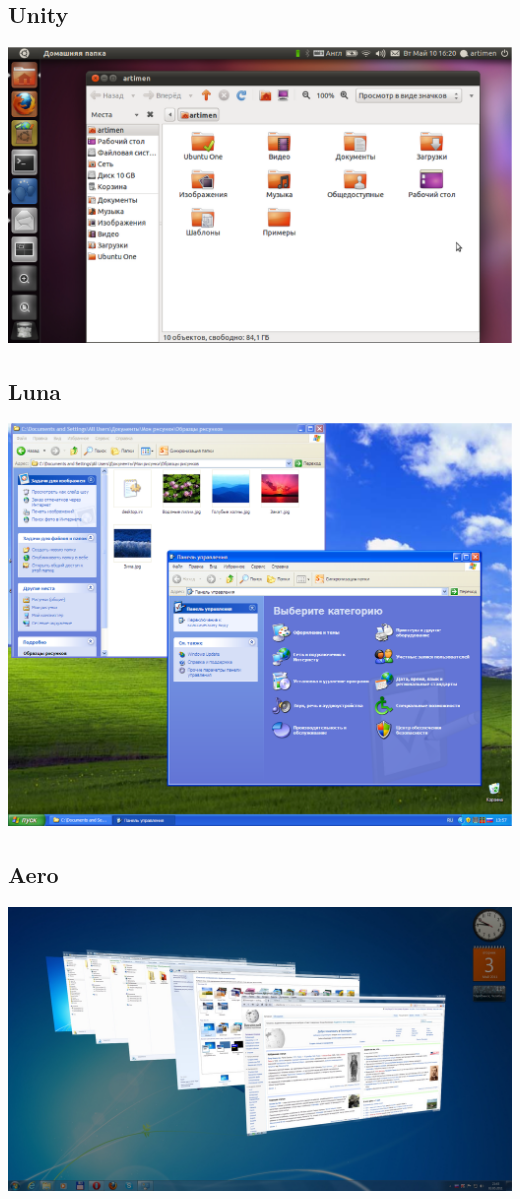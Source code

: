 \subsection{Unity}\label{base:software:de:unity}
\includegraphics[scale=0.35]{base/Software/Unity.eps}
\subsection{Luna}\label{base:software:de:luna}
\includegraphics[scale=0.28]{base/Software/Luna.eps}
\subsection{Aero}\label{base:software:de:aero}
\includegraphics[scale=0.25]{base/Software/Aero}
